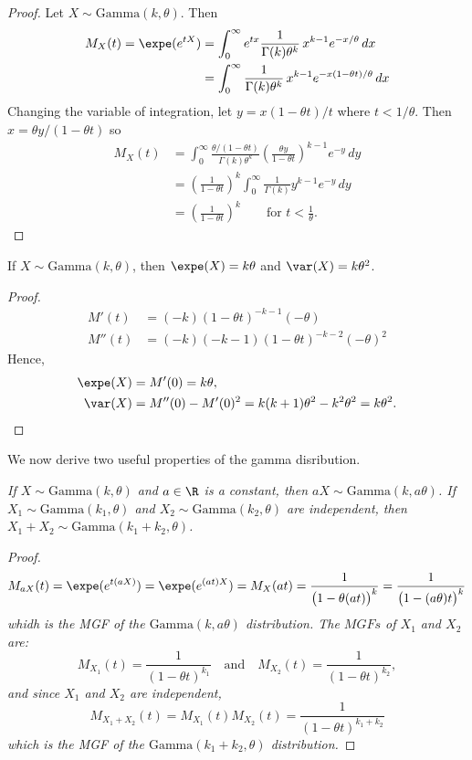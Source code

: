 \begin{proof} %
Let $X\sim\text{Gamma}(k,\theta)$. Then
\begin{align*}
M_X(t) = \expe(e^{tX})
	& = \int_0^\infty e^{tx} \frac{1}{\Gamma(k)\theta^k}\,x^{k-1} e^{-x/\theta}\,dx \\
	& = \int_0^\infty \frac{1}{\Gamma(k)\theta^k}\,x^{k-1} e^{-x(1-\theta t)/\theta}\,dx 
\end{align*}
Changing the variable of integration, let $y=x(1-\theta t)/t$ where $t<1/\theta$. Then $x=\theta y/(1-\theta t)$ so
\begin{align*}
M_X(t)
	& = \int_0^\infty \frac{\theta/(1-\theta t)}{\Gamma(k)\theta^k}\left(\frac{\theta y}{1-\theta t}\right)^{k-1} e^{-y}\,dy \\
	& = \left(\frac{1}{1-\theta t}\right)^{k} \int_0^\infty \frac{1}{\Gamma(k)}y^{k-1} e^{-y}\,dy \\
	& = \left(\frac{1}{1-\theta t}\right)^{k} \qquad\text{for } t < \frac{1}{\theta}.
\end{align*}
\end{proof}

\begin{corollary}
If $X\sim\text{Gamma}(k,\theta)$, then $\expe(X) = k\theta$ and $\var(X) = k\theta^2$.
\end{corollary}
\begin{proof}
\begin{align*}
M'(t)	& = (-k)(1-\theta t)^{-k-1}(-\theta) \\
M''(t)	& = (-k)(-k-1)(1-\theta t)^{-k-2}(-\theta)^2
\end{align*}
Hence,
\begin{align*}
\expe(X)	& = M'(0) = k\theta, \\
\var(X)		& = M''(0)- M'(0)^2 = k(k+1)\theta^2 - k^2\theta^2 = k\theta^2.
\end{align*}
\end{proof}

We now derive two useful properties of the gamma disribution.
\begin{lemma}\label{lem:properties_of_gamma_distribution}
\ben
\it If $X\sim\text{Gamma}(k,\theta)$ and $a\in\R$ is a constant, then $aX\sim\text{Gamma}(k,a\theta)$.
\it If $X_1\sim\text{Gamma}(k_1,\theta)$ and $X_2\sim\text{Gamma}(k_2,\theta)$ are independent, then $X_1+X_2\sim\text{Gamma}(k_1+k_2,\theta)$.
\een
\end{lemma}
\begin{proof}
\ben
\it
\[
M_{aX}(t) = \expe(e^{t(aX)}) = \expe(e^{(at)X}) = M_X(at) = \frac{1}{\big(1-\theta (at)\big)^k} = \frac{1}{\big(1-(a\theta)t\big)^k} 
\]
whidh is the MGF of the $\text{Gamma}(k,a\theta)$ distribution.
\it
The $MGFs$ of $X_1$ and $X_2$ are:
\[
M_{X_1}(t) = \frac{1}{(1-\theta t)^{k_1}}
\quad\text{and}\quad
M_{X_2}(t) = \frac{1}{(1-\theta t)^{k_2}},
\]
and since $X_1$ and $X_2$ are independent, 
\[
M_{X_1+X_2}(t) 
=	M_{X_1}(t)M_{X_2}(t) 
= \frac{1}{(1-\theta t)^{k_1+k_2}}
\]
which is the MGF of the $\text{Gamma}(k_1+k_2,\theta)$ distribution.
\een
\end{proof}



